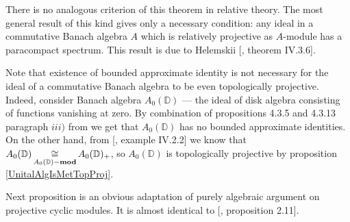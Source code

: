 There is no analogous criterion of this theorem in relative theory. The most general result of this kind gives only a necessary condition: any ideal in a commutative Banach algebra $A$ which is relatively projective as $A$-module has a paracompact spectrum. This result is due to Helemskii [\cite{HelHomolBanTopAlg}, theorem IV.3.6]. 

Note that existence of bounded approximate identity is not necessary for the ideal of a commutative Banach algebra to be even topologically projective. Indeed, consider Banach algebra  $A_0(\mathbb{D})$ --- the ideal of disk algebra consisting of functions vanishing at zero. By combination of propositions 4.3.5  and 4.3.13 paragraph $iii)$ from \cite{DalBanAlgAutCont} we get that $A_0(\mathbb{D})$ has no bounded approximate identities. On the other hand, from [\cite{HelBanLocConvAlg}, example IV.2.2] we know that $A_0(\mathbb{D})\mathop{\mathbin{\cong}}\limits_{A_0(\mathbb{D})-\mathbf{mod}} A_0(\mathbb{D})_+$, so $A_0(\mathbb{D})$ is topologically projective by proposition \ref{UnitalAlgIsMetTopProj}.

Next proposition is an obvious adaptation of purely algebraic argument on projective cyclic modules. It is almost identical to [\cite{WhiteInjmoduAlg}, proposition 2.11].

